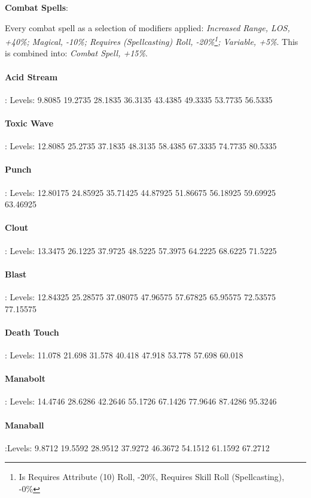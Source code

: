 \begin{multicols*}{2}
	\textbf{Combat Spells}:
	
	Every combat spell as a selection of modifiers applied: \textit{Increased Range, LOS, +40\%; Magical, -10\%; Requires (Spellcasting) Roll, -20\%\footnote{Is Requires Attribute (10) Roll, -20\%, Requires Skill Roll (Spellcasting), -0\%}; Variable, +5\%}. This is combined into: \textit{Combat Spell, +15\%}.
	
	\paragraph{Acid Stream}: Levels: 9.8085 19.2735 28.1835 36.3135 43.4385 49.3335 53.7735 56.5335
	
	\paragraph{Toxic Wave}: Levels: 12.8085 25.2735 37.1835 48.3135 58.4385 67.3335 74.7735 80.5335
	
	\paragraph{Punch}: Levels: 12.80175 24.85925 35.71425 44.87925 51.86675 56.18925 59.69925 63.46925
	
	\paragraph{Clout}: Levels: 13.3475 26.1225 37.9725 48.5225 57.3975 64.2225 68.6225 71.5225
	
	\paragraph{Blast}: 	Levels: 12.84325 25.28575 37.08075 47.96575 57.67825 65.95575 72.53575 77.15575
	
	\paragraph{Death Touch}: Levels: 11.078 21.698 31.578 40.418 47.918 53.778 57.698 60.018
	
	\paragraph{Manabolt}: Levels: 14.4746 28.6286 42.2646 55.1726 67.1426 77.9646 87.4286 95.3246
	
	\paragraph{Manaball}:Levels: 9.8712 19.5592 28.9512 37.9272 46.3672 54.1512 61.1592 67.2712
	

\end{multicols*}
